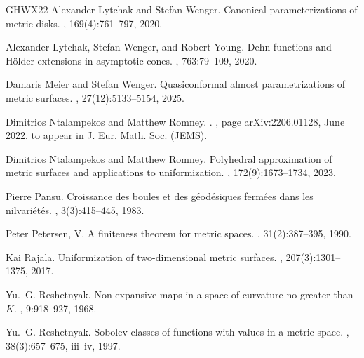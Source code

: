 \documentclass[a4paper,leqno]{amsart}
\numberwithin{equation}{section}
\theoremstyle{remark}
\theoremstyle{remark}
\begin{document}
\begin{thebibliography}{GHWX22}
Alexander Lytchak and Stefan Wenger.
\newblock Canonical parameterizations of metric disks.
, 169(4):761--797, 2020.

Alexander Lytchak, Stefan Wenger, and Robert Young.
\newblock Dehn functions and {H}\"older extensions in asymptotic cones.
, 763:79--109, 2020.

Damaris Meier and Stefan Wenger.
\newblock Quasiconformal almost parametrizations of metric surfaces.
, 27(12):5133--5154, 2025.

Dimitrios {Ntalampekos} and Matthew {Romney}.
.
, page arXiv:2206.01128, June 2022.
\newblock to appear in J. Eur. Math. Soc. (JEMS).

Dimitrios Ntalampekos and Matthew Romney.
\newblock Polyhedral approximation of metric surfaces and applications to uniformization.
, 172(9):1673--1734, 2023.

Pierre Pansu.
\newblock Croissance des boules et des g\'eod\'esiques ferm\'ees dans les nilvari\'et\'es.
, 3(3):415--445, 1983.

Peter Petersen, V.
\newblock A finiteness theorem for metric spaces.
, 31(2):387--395, 1990.

Kai Rajala.
\newblock Uniformization of two-dimensional metric surfaces.
, 207(3):1301--1375, 2017.

Yu.~G. Reshetnyak.
\newblock Non-expansive maps in a space of curvature no greater than {$K$}.
, 9:918--927, 1968.

Yu.~G. Reshetnyak.
\newblock Sobolev classes of functions with values in a metric space.
, 38(3):657--675, iii--iv, 1997.


\end{thebibliography}
\end{document}
